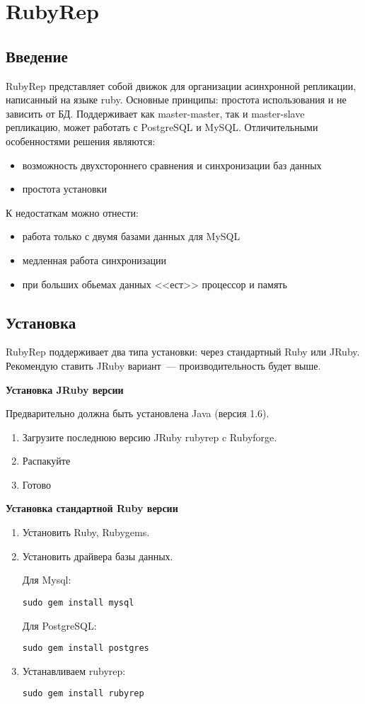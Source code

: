 \section{RubyRep}
\subsection{Введение}
RubyRep представляет собой движок для организации асинхронной репликации, написанный на языке ruby. 
Основные принципы: простота использования и не зависить от БД. 
Поддерживает как master-master, так и master-slave репликацию, может работать с PostgreSQL и MySQL.
Отличительными особенностями решения являются:
\begin{itemize}
\item возможность двухстороннего сравнения и синхронизации баз данных
\item простота установки
\end{itemize}
К недостаткам можно отнести:
\begin{itemize}
\item работа только с двумя базами данных для MySQL
\item медленная работа синхронизации 
\item при больших обьемах данных <<ест>> процессор и память
\end{itemize}


\subsection{Установка}
RubyRep поддерживает два типа установки: через стандартный Ruby или JRuby. 
Рекомендую ставить JRuby вариант~--- производительность будет выше.

\textbf{Установка JRuby версии}

Предварительно должна быть установлена Java (версия 1.6).
\begin{enumerate}
 \item Загрузите последнюю версию JRuby rubyrep c Rubyforge.
 \item Распакуйте
 \item Готово
\end{enumerate}

\textbf{Установка стандартной Ruby версии}
\begin{enumerate}
\item Установить Ruby, Rubygems.
\item Установить драйвера базы данных.

Для Mysql: 
\begin{lstlisting}[label=lst:rubyrep1,caption=Установка]
sudo gem install mysql
\end{lstlisting}

Для PostgreSQL:
\begin{lstlisting}[label=lst:rubyrep2,caption=Установка]
sudo gem install postgres
\end{lstlisting}

\item Устанавливаем rubyrep:
\begin{lstlisting}[label=lst:rubyrep3,caption=Установка]
sudo gem install rubyrep
\end{lstlisting}
\end{enumerate}


